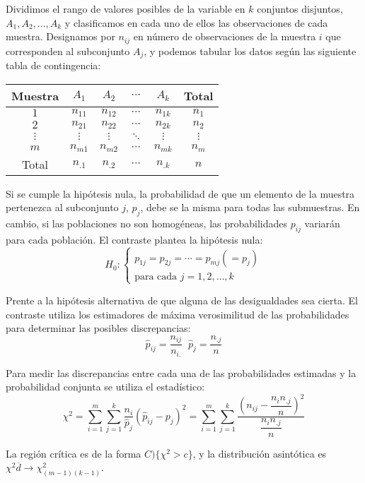 Dividimos el rango de valores posibles de la variable en $k$ conjuntos disjuntos, $A_1, A_2,\ldots,A_k$ y clasificamos en cada uno de ellos las observaciones de cada muestra. Designamos por $n_{ij}$ en n\'umero de observaciones de la muestra $i$ que corresponden al subconjunto $A_j$, y podemos tabular los datos seg\'un las siguiente tabla de contingencia:




\begin{tabular}{|c||cccc|c|}
\hline 
 Muestra & $A_1$ & $A_2$ & $\cdots$ & $A_k$ & Total \tabularnewline
\hline 
$1$ & $n_{11}$ & $n_{12}$ & $\cdots$ & $n_{1k}$ & $n_{1}$ \tabularnewline
$2$ & $n_{21}$ & $n_{22}$ & $\cdots$ & $n_{2k}$ & $n_{2}$ \tabularnewline
$\vdots$ & $\vdots$ & $\vdots$ & $\ddots$ & $\vdots$ & $\vdots$ \tabularnewline
$m$ & $n_{m1}$ & $n_{m2}$ & $\cdots$ & $n_{mk}$ & $n_{m}$ \tabularnewline
\hline 
Total  & $n_{.1}$ & $n_{.2}$ & $\cdots$ & $n_{.k}$ & $n$ \tabularnewline
\hline 
\end{tabular}

Si se cumple la hip\'otesis nula, la probabilidad de que un elemento de la muestra pertenezca al subconjunto $j$, $p_j$, debe se la misma para todas las submuestras. En cambio, si las poblaciones no son homog\'eneas, las probabilidades $p_{ij}$ variar\'an para cada poblaci\'on. El contraste plantea la hip\'otesis nula:
\[H_0:\left\{\begin{matrix}
p_{1j}=p_{2j}=\cdots=p_{mj}(=p_j) \\
\text{para cada  } j=1,2,\ldots,k
\end{matrix}\right.\]

Prente a la hip\'otesis alternativa de que alguna de las desigualdades sea cierta. El contraste utiliza los estimadores de m\'axima verosimilitud de las probabilidades para determinar las posibles discrepancias: 
\[\hat{p}_{ij}=\dfrac{n_{ij}}{n_{i.}} \;\;\hat{p}_j=\dfrac{n_{.j}}{n}\]

Para medir las discrepancias entre cada una de las probabilidades estimadas y la probabilidad conjunta se utiliza el estad\'istico:
\[\chi^2=\sum_{i=1}^m\sum_{j=1}^k\dfrac{n_i}{\hat{p}_{j}}(\hat{p}_{ij}-p_j)^2=\sum_{i=1}^m\sum_{j=1}^k\dfrac{(n_{ij}-\dfrac{n_in_{.j}}{n})^2}{\dfrac{n_in_{.j}}{n}}\]

La regi\'on cr\'itica es de la forma $C)\{\chi^2>c\}$, y la distribuci\'on asint\'otica es $\chi^2\overline{d}{\to}\chi^2_{(m-1)(k-1)}$.


